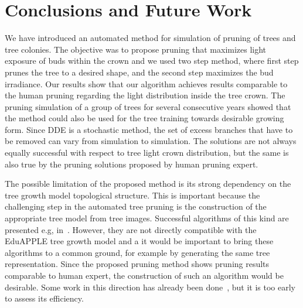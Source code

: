 \section{Conclusions and Future Work}
We have introduced an automated method for simulation of pruning of
trees and tree colonies. The objective was to propose pruning that
maximizes light exposure of buds within the crown and we used two step
method, where first step prunes the tree to a desired shape, and the
second step maximizes the bud irradiance. Our results show that our algorithm achieves results comparable
to the human pruning regarding the light
distribution inside the tree crown. The pruning simulation of a group of
trees for several consecutive years showed that the method could also be
used for the tree 
training towards desirable growing form. Since DDE is
a stochastic method, the set of excess branches that have to be removed
can vary from simulation to simulation. The solutions are not always
equally successful with respect to tree light crown distribution, but
the same is also true by the pruning solutions proposed by human pruning
expert.

The possible limitation of the proposed method is its strong dependency
on the tree growth model topological structure. This is important
because the challenging step in the automated tree pruning is the
construction of the appropriate tree model from tree images. Successful
algorithms of this kind are presented e.g, in~\cite{akbar_novel_2016,benes_visual_1997,de_reffye_plant_1988,palubicki_self-organizing_2009}.
However, they are not directly compatible with the EduAPPLE tree growth model and a
it would be important to bring these algorithms to a common ground, 
for example by generating the same tree representation. 
Since the proposed pruning method shows pruning results comparable to human
expert, the construction of such an algorithm would be desirable. Some
work in this direction has already been done~\cite{kohek_estimation_2017}, 
but it is too early to assess its efficiency.

